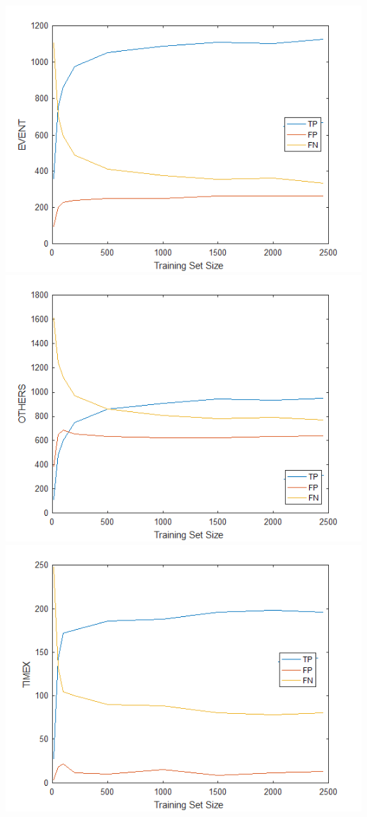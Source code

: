 \documentclass[letterpaper, 10 pt, conference]{ieeeconf}
\begin{document}
\includegraphics[scale = 0.65]{f1.png}
\includegraphics[scale = 0.65]{f2.png}
\includegraphics[scale = 0.65]{f3.png}
\end{document}
